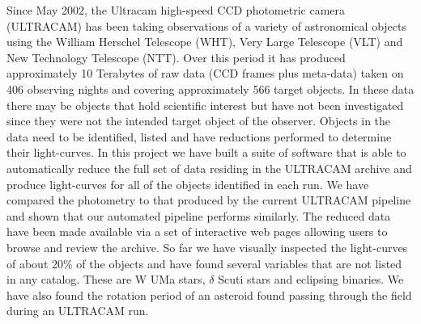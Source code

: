 Since May 2002, the  Ultracam high-speed CCD photometric camera (ULTRACAM) has been taking observations of a variety of astronomical objects using the William Herschel Telescope (WHT), Very Large Telescope (VLT) and New Technology Telescope (NTT). Over this period it has produced approximately 10 Terabytes of raw data (CCD frames plus meta-data) taken on 406 observing nights and covering approximately 566 target objects. In these data there may be objects that hold scientific interest but have not been investigated since they were not the intended target object of the observer. Objects in the data need to be identified, listed and have reductions performed to determine their light-curves. In this project we have built a suite of software that is able to automatically reduce the full set of data residing in the ULTRACAM archive and produce light-curves for all of the objects identified in each run. We have compared the photometry to that produced by the current ULTRACAM pipeline and shown that our automated pipeline performs similarly. The reduced data have been made available via a set of interactive web pages allowing users to browse and review the archive. So far we have visually inspected the light-curves of about 20\% of the objects and have found several variables that are not listed in any catalog. These are {W UMa} stars, $\delta$ Scuti stars and eclipsing binaries. We have also found the rotation period of an asteroid found passing through the field during an ULTRACAM run. 
